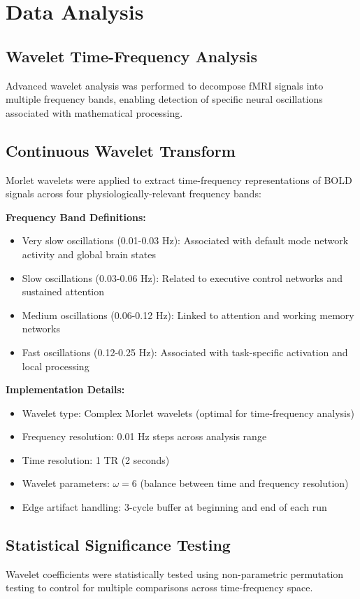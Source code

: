 \documentclass[12pt, a4paper]{article}
\begin{document}
\section{Data Analysis}
\subsection{Wavelet Time-Frequency Analysis}
Advanced wavelet analysis was performed to decompose fMRI signals into multiple frequency bands, enabling detection of specific neural oscillations associated with mathematical processing.

\subsection{Continuous Wavelet Transform}
Morlet wavelets were applied to extract time-frequency representations of BOLD signals across four physiologically-relevant frequency bands:

\vspace{0.5\baselineskip}
\noindent
\textbf{Frequency Band Definitions:} 
\begin{itemize}
\item Very slow oscillations (0.01-0.03 Hz): Associated with default mode network activity and global brain states
\item Slow oscillations (0.03-0.06 Hz): Related to executive control networks and sustained attention
\item Medium oscillations (0.06-0.12 Hz): Linked to attention and working memory networks
\item Fast oscillations (0.12-0.25 Hz): Associated with task-specific activation and local processing
\end{itemize}

\noindent
\textbf{Implementation Details:}
\begin{itemize}
\item Wavelet type: Complex Morlet wavelets (optimal for time-frequency analysis)
\item Frequency resolution: 0.01 Hz steps across analysis range
\item Time resolution: 1 TR (2 seconds)
\item Wavelet parameters: $\omega = 6$ (balance between time and frequency resolution)
\item Edge artifact handling: 3-cycle buffer at beginning and end of each run
\end{itemize}


\subsection{Statistical Significance Testing}
Wavelet coefficients were statistically tested using non-parametric permutation testing to control for multiple comparisons across time-frequency space.
\end{document}
